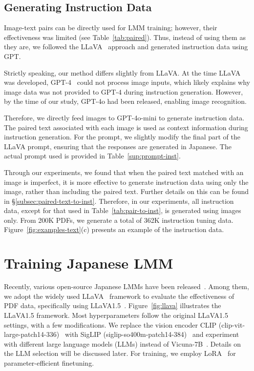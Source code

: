 \subsection{Generating Instruction Data}\label{subsec:generate-inst-data}
Image-text pairs can be directly used for LMM training; however, their effectiveness was limited (see Table~\ref{tab:paired}).
Thus, instead of using them as they are, we followed the LLaVA~\cite{llava} approach and generated instruction data using GPT.

Strictly speaking, our method differs slightly from LLaVA.
At the time LLaVA was developed, GPT-4~\cite{openai2023gpt4} could not process image inputs, which likely explains why image data was not provided to GPT-4 during instruction generation.
However, by the time of our study, GPT-4o had been released, enabling image recognition.

Therefore, we directly feed images to GPT-4o-mini to generate instruction data. 
The paired text associated with each image is used as context information during instruction generation. 
For the prompt, we slightly modify the final part of the LLaVA prompt, ensuring that the responses are generated in Japanese.
The actual prompt used is provided in Table~\ref{sup:prompt-inst}.

Through our experiments, we found that when the paired text matched with an image is imperfect, it is more effective to generate instruction data using only the image, rather than including the paired text.
Further details on this can be found in \S\ref{subsec:paired-text-to-inst}.
Therefore, in our experiments, all instruction data, except for that used in Table~\ref{tab:pair-to-inst}, is generated using images only.
From 200K PDFs, we generate a total of 362K instruction tuning data.
Figure~\ref{fig:examples-text}(c) presents an example of the instruction data.



\section{Training Japanese LMM}
Recently, various open-source Japanese LMMs have been released~\cite{JapaneseInstructBLIPAlpha,JapaneseStableVLM,akiba2025evolutionary,BlipJapaneseStableLM,inoue2024heron,cyberagent2024llava,VILAjp}.
Among them, we adopt the widely used LLaVA~\cite{llava} framework to evaluate the effectiveness of PDF data, specifically using LLaVA1.5~\cite{llava1.5}.
Figure~\ref{fig:llava} illustrates the LLaVA1.5 framework.
Most hyperparameters follow the original LLaVA1.5 settings, with a few modifications.
We replace the vision encoder CLIP (clip-vit-large-patch14-336)~\cite{clip} with SigLIP (siglip-so400m-patch14-384)~\cite{SigLIP} and experiment with different large language models (LLMs) instead of Vicuna-7B~\cite{vicuna2023}.
Details on the LLM selection will be discussed later.
For training, we employ LoRA~\cite{lora} for parameter-efficient finetuning.

